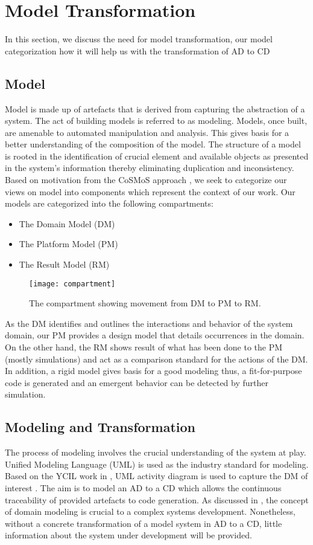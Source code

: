 \documentclass[10pt]{article}
\begin{document}
\section{Model Transformation}
In this section, we discuss the need for model transformation, our model categorization how it will help us with the transformation of AD to CD

	\subsection{Model}
Model is made up of artefacts that is derived from capturing the abstraction of a system\cite{Polack08complexsystems}. The act of building models is referred to as modeling. Models, once built, are amenable to automated manipulation and analysis. This gives basis for a better understanding of the composition of the model. The structure of a model is rooted in the identification of crucial element and available objects as presented in the system’s information thereby eliminating duplication and inconsistency. Based on motivation from the CoSMoS approach \cite{Garnett_usingthe}, we seek to categorize our views on model into components which represent the context of our work. Our models are categorized into the following compartments:
\begin{itemize}
\item The Domain Model (DM)
\item The Platform Model (PM)
\item The Result Model (RM)
\end{itemize}

\begin{figure}[!ht]
  \centering
   \texttt{[image: compartment]}
  \caption{The compartment showing movement from DM to PM to RM.}
  \label{fig:compartment}
\end{figure}

As the DM identifies and outlines the interactions and behavior of the system domain, our PM provides a design model that details occurrences in the domain. On the other hand, the RM shows result of what has been done to the PM (mostly simulations) and act as a comparison standard for the actions of the DM. In addition, a rigid model gives basis for a good modeling thus, a fit-for-purpose code is generated and an emergent behavior can be detected by further simulation.

\subsection{Modeling and Transformation}
The process of modeling involves the crucial understanding of the system at play. Unified Modeling Language (UML) is used as the industry standard for modeling. Based on the YCIL work in \cite{software}, UML activity diagram is used to capture the DM of interest \cite{Donald2003}. The aim is to model an AD to a CD which allows the continuous traceability of provided artefacts to code generation. As discussed in \cite{cosmos:tech-report}, the concept of domain modeling is crucial to a complex systems development. Nonetheless, without a concrete transformation of a model system in AD to a CD, little information about the system under development will be provided.
\end{document}

